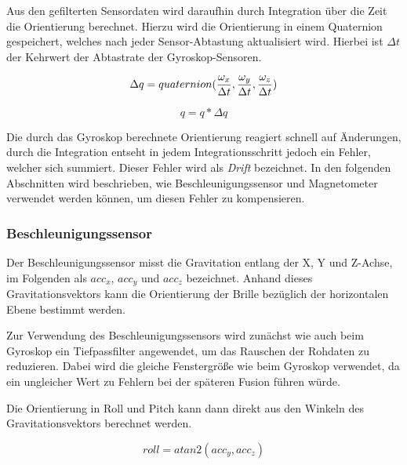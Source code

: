 Aus den gefilterten Sensordaten wird daraufhin durch Integration über
die Zeit die Orientierung berechnet. Hierzu wird die Orientierung in einem Quaternion gespeichert, welches nach jeder Sensor-Abtastung aktualisiert wird. Hierbei ist $\Delta t$ der Kehrwert der Abtastrate der Gyroskop-Sensoren.

\begin{equation}
    \Delta q = quaternion({\omega_x \over {\Delta t}}, {\omega_y \over {\Delta t}}, {\omega_z \over {\Delta t}}) \\
\end{equation}

\begin{equation}
    q = q * \Delta q
\end{equation}

Die durch das Gyroskop berechnete Orientierung reagiert schnell auf
Änderungen, durch die Integration entseht in jedem Integrationsschritt jedoch ein Fehler, welcher sich summiert. Dieser Fehler wird als \emph{Drift} bezeichnet. In den folgenden Abschnitten wird beschrieben, wie Beschleunigungssensor und Magnetometer verwendet werden können, um diesen Fehler zu kompensieren.


\subsubsection{Beschleunigungssensor}

Der Beschleunigungssensor misst die Gravitation entlang der X, Y und Z-Achse, im Folgenden als $acc_x$, $acc_y$ und $acc_z$ bezeichnet. Anhand dieses Gravitationsvektors kann die Orientierung der Brille bezüglich der horizontalen Ebene bestimmt werden.

Zur Verwendung des Beschleunigungssensors wird zunächst wie auch beim
Gyroskop ein Tiefpassfilter angewendet, um das Rauschen der Rohdaten zu
reduzieren. Dabei wird die gleiche Fenstergröße wie beim Gyroskop
verwendet, da ein ungleicher Wert zu Fehlern bei der späteren Fusion
führen würde. 


Die Orientierung in Roll und Pitch kann dann direkt aus den Winkeln des Gravitationsvektors berechnet werden.

\begin{equation}
    roll = atan2(acc_y, acc_z)
\end{equation}

